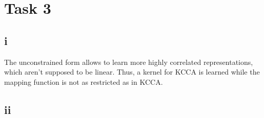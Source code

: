 \section*{Task 3}

\subsection*{i}
The unconstrained form allows to learn more highly correlated representations, which aren't supposed to be linear.
Thus, a kernel for KCCA is learned while the mapping function is not as restricted as in KCCA.

\subsection*{ii}
